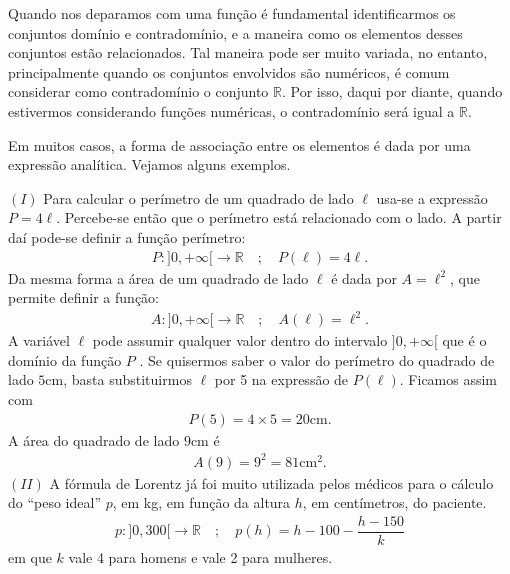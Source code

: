 \documentclass[extrafontsizes, twoside, 11pt, openright, final]{memoir}
\begin{document}
Quando nos deparamos com uma função é fundamental identificarmos os conjuntos domínio e contradomínio, e a maneira como os elementos desses conjuntos estão relacionados. Tal maneira pode ser muito variada, no entanto, principalmente quando os conjuntos envolvidos são numéricos, é comum considerar como contradomínio o conjunto $\mathbb{R}$. Por isso, daqui por diante, quando estivermos considerando funções numéricas, o contradomínio será igual a $\mathbb{R}$.

Em muitos casos, a forma de associação entre os elementos é dada por uma expressão analítica. Vejamos alguns exemplos.

$(I)$ Para calcular o perímetro de um quadrado de lado $\ell$ usa-se a expressão $P=4\ell$. Percebe-se então que o perímetro está relacionado com o lado. A partir daí pode-se definir a função perímetro:
\begin{equation*}
	\begin{split}P: ]0,+\infty[\to \mathbb{R} \quad ; \quad P(\ell)=4\ell.\end{split}
\end{equation*}
Da mesma forma a área de um quadrado de lado $\ell$ é dada por $A=\ell^2$, que permite definir a função:
\begin{equation*}
	\begin{split}A: ]0,+\infty[\to \mathbb{R} \quad ; \quad A(\ell)=\ell^2.\end{split}
\end{equation*}
A variável $\ell$ pode assumir qualquer valor dentro do intervalo $]0,+\infty[$ que é o domínio da função $P$ . Se quisermos saber o valor do perímetro do quadrado de lado $5$cm, basta substituirmos $\ell$ por 5 na expressão de  $P(\ell)$. Ficamos assim com
\begin{equation*}
	\begin{split}P(5)=4\times 5 = 20\mathrm{cm}.\end{split}
\end{equation*}
A área do quadrado de lado $9$cm é
\begin{equation*}
	\begin{split}A(9)=9^2=81\text{cm}^2.\end{split}
\end{equation*}
$(II)$ A fórmula de Lorentz já foi muito utilizada pelos médicos para o cálculo do “peso ideal” $p$, em kg, em função da altura $h$, em centímetros, do paciente.
\begin{equation*}
	\begin{split}p:]0,300[\to \mathbb{R}\quad ; \quad p(h)=h-100-\dfrac{h-150}{k}\end{split}
\end{equation*}
em que $k$ vale 4 para homens e vale 2 para mulheres.
\end{document}
